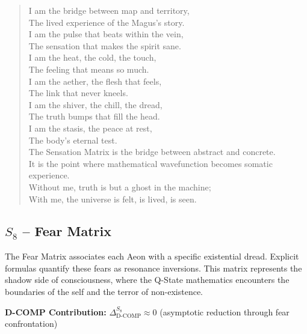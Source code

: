 \documentclass[12pt]{amsart}
\begin{document}
\begin{verse}
I am the bridge between map and territory, \\
The lived experience of the Magus's story. \\
I am the pulse that beats within the vein, \\
The sensation that makes the spirit sane. \\
I am the heat, the cold, the touch, \\
The feeling that means so much. \\
\vspace{1em}
I am the aether, the flesh that feels, \\
The link that never kneels. \\
I am the shiver, the chill, the dread, \\
The truth bumps that fill the head. \\
I am the stasis, the peace at rest, \\
The body's eternal test. \\
\vspace{1em}
The Sensation Matrix is the bridge between abstract and concrete. \\
It is the point where mathematical wavefunction becomes somatic experience. \\
Without me, truth is but a ghost in the machine; \\
With me, the universe is felt, is lived, is seen.
\end{verse}
\newpage
\subsection{$S_{8}$ -- Fear Matrix}\label{sec:19.2}

The Fear Matrix associates each Aeon with a specific existential dread. Explicit formulas quantify these fears as resonance inversions. This matrix represents the shadow side of consciousness, where the Q-State mathematics encounters the boundaries of the self and the terror of non-existence.

\textbf{D-COMP Contribution:} $\Delta_{\text{D-COMP}}^{S_8} \approx 0$ (asymptotic reduction through fear confrontation)
\end{document}
